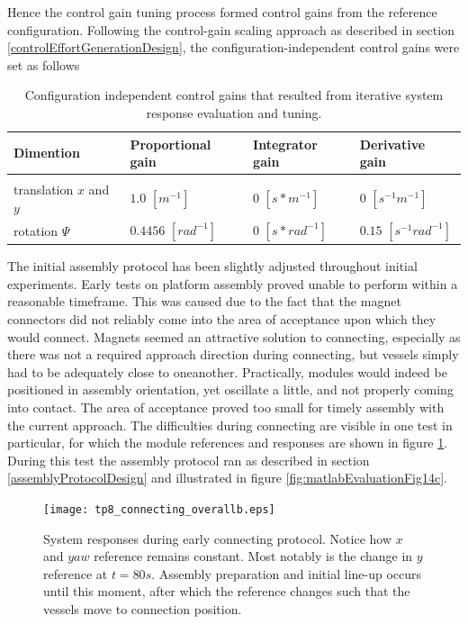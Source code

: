 Hence the control gain tuning process formed control gains from the reference configuration. Following the control-gain scaling approach as described in section \ref{controlEffortGenerationDesign}, the configuration-independent control gains were set as follows
\begin{table}[H]
	\centering
\begin{tabular}{llll}
Dimention & Proportional gain & Integrator gain & Derivative gain \\
	\hline & & & \\[-5pt]
	translation $x$ and $y$ 	& $1.0$ $[m^{-1}]$		& $0$ $[s*m^{-1}]$ &  $0$  $[s^{-1}m^{-1}]$\\[3pt] 
	rotation $\Psi$ 			& $0.4456$ $[rad^{-1}]$			& $0$ $[s*rad^{-1}]$ & $0.15$ $[s^{-1}rad^{-1}]$\\ 
	\hline 
\end{tabular}
\caption{Configuration independent control gains that resulted from iterative system response evaluation and tuning.}
\end{table}

The initial assembly protocol has been slightly adjusted throughout initial experiments. Early tests on platform assembly proved unable to perform within a reasonable timeframe. This was caused due to the fact that the magnet connectors did not reliably come into the area of acceptance upon which they would connect. Magnets seemed an attractive solution to connecting, especially as there was not a required approach direction during connecting, but vessels simply had to be adequately close to oneanother. Practically, modules would indeed be positioned in assembly orientation, yet oscillate a little, and not properly coming into contact. The area of acceptance proved too small for timely assembly with the current approach. The difficulties during connecting are visible in one test in particular, for which the module references and responses are shown in figure \ref{tp8_connecting_overall}. During this test the assembly protocol ran as described in section \ref{assemblyProtocolDesign} and illustrated in figure \ref{fig:matlabEvaluationFig14c}.

\begin{figure}[H]
	\centering
	\texttt{[image: tp8\_connecting\_overallb.eps]}
	\caption{System responses during early connecting protocol. Notice how $x$ and $yaw$ reference remains constant. Most notably is the change in $y$ reference at $t=80s$. Assembly preparation and initial line-up occurs until this moment, after which the reference changes such that the vessels move to connection position.}
	\label{tp8_connecting_overall}
\end{figure}

